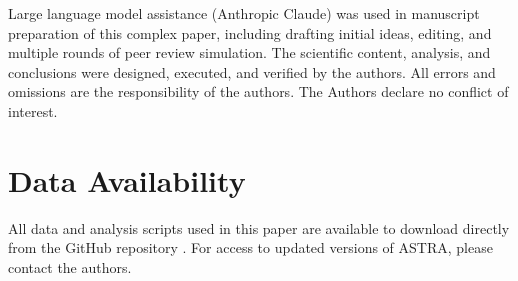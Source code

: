 \documentclass[usenatbib]{rasti}
\begin{document}
Large language model assistance (Anthropic Claude) was used in manuscript preparation of this complex paper, including drafting initial ideas, editing, and multiple rounds of peer review simulation. The scientific content, analysis, and conclusions were designed, executed, and verified by the authors. All errors and omissions are the responsibility of the authors. The Authors declare no conflict of interest.

\section*{Data Availability}

All data and analysis scripts used in this paper are available to download directly from the GitHub repository \cite{astra_github}. For access to updated versions of ASTRA, please contact the authors.

\label{lastpage}



\end{document}
